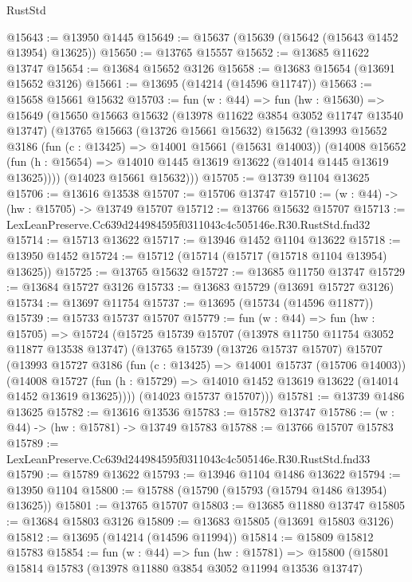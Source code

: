 \begin{lexlean}{RustStd}
\begin{coremodule}
@15643 := @13950 @1445
@15649 := @15637 (@15639 (@15642 (@15643 @1452 @13954) @13625))
@15650 := @13765 @15557
@15652 := @13685 @11622 @13747
@15654 := @13684 @15652 @3126
@15658 := @13683 @15654 (@13691 @15652 @3126)
@15661 := @13695 (@14214 (@14596 @11747))
@15663 := @15658 @15661 @15632
@15703 := fun (w : @44) =>
  fun (hw : @15630) =>
  @15649
    (@15650
      @15663
      @15632
      (@13978 @11622 @3854 @3052 @11747 @13540 @13747)
      (@13765
        @15663
        (@13726 @15661 @15632)
        @15632
        (@13993
          @15652
          @3186
          (fun (c : @13425) => @14001 @15661 (@15631 @14003))
          (@14008
            @15652
            (fun (h : @15654) => @14010 @1445 @13619 @13622 (@14014 @1445 @13619 @13625))))
        (@14023 @15661 @15632)))
@15705 := @13739 @1104 @13625
@15706 := @13616 @13538
@15707 := @15706 @13747
@15710 := (w : @44) -> (hw : @15705) -> @13749 @15707
@15712 := @13766 @15632 @15707
@15713 := LexLeanPreserve.Cc639d244984595f0311043c4c505146e.R30.RustStd.fnd32
@15714 := @15713 @13622
@15717 := @13946 @1452 @1104 @13622
@15718 := @13950 @1452
@15724 := @15712 (@15714 (@15717 (@15718 @1104 @13954) @13625))
@15725 := @13765 @15632
@15727 := @13685 @11750 @13747
@15729 := @13684 @15727 @3126
@15733 := @13683 @15729 (@13691 @15727 @3126)
@15734 := @13697 @11754
@15737 := @13695 (@15734 (@14596 @11877))
@15739 := @15733 @15737 @15707
@15779 := fun (w : @44) =>
  fun (hw : @15705) =>
  @15724
    (@15725
      @15739
      @15707
      (@13978 @11750 @11754 @3052 @11877 @13538 @13747)
      (@13765
        @15739
        (@13726 @15737 @15707)
        @15707
        (@13993
          @15727
          @3186
          (fun (c : @13425) => @14001 @15737 (@15706 @14003))
          (@14008
            @15727
            (fun (h : @15729) => @14010 @1452 @13619 @13622 (@14014 @1452 @13619 @13625))))
        (@14023 @15737 @15707)))
@15781 := @13739 @1486 @13625
@15782 := @13616 @13536
@15783 := @15782 @13747
@15786 := (w : @44) -> (hw : @15781) -> @13749 @15783
@15788 := @13766 @15707 @15783
@15789 := LexLeanPreserve.Cc639d244984595f0311043c4c505146e.R30.RustStd.fnd33
@15790 := @15789 @13622
@15793 := @13946 @1104 @1486 @13622
@15794 := @13950 @1104
@15800 := @15788 (@15790 (@15793 (@15794 @1486 @13954) @13625))
@15801 := @13765 @15707
@15803 := @13685 @11880 @13747
@15805 := @13684 @15803 @3126
@15809 := @13683 @15805 (@13691 @15803 @3126)
@15812 := @13695 (@14214 (@14596 @11994))
@15814 := @15809 @15812 @15783
@15854 := fun (w : @44) =>
  fun (hw : @15781) =>
  @15800
    (@15801
      @15814
      @15783
      (@13978 @11880 @3854 @3052 @11994 @13536 @13747)

\end{coremodule}
\end{lexlean}
